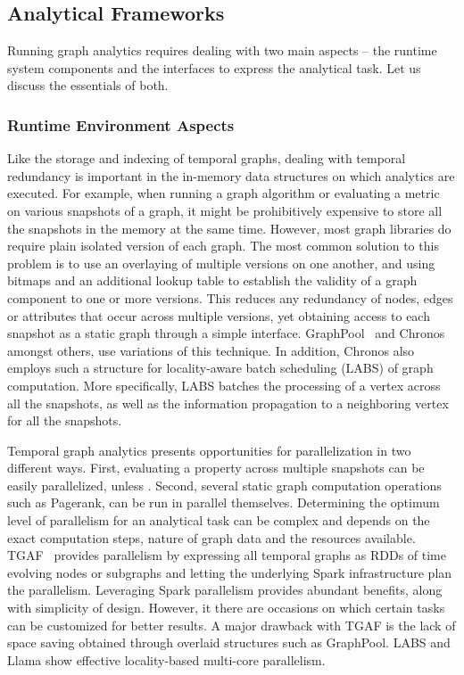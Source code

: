 \documentclass[graybox, natbib, nosecnum, twocolumn]{svmult}
\begin{document}
\subsection{Analytical Frameworks}

Running graph analytics requires dealing with two main aspects -- the runtime system components and the interfaces to express the analytical task. Let us discuss the essentials of both.

\subsubsection{Runtime Environment Aspects}

 Like the storage and indexing of temporal graphs, dealing with temporal redundancy is important in the in-memory data structures on which analytics are executed. For example, when running a graph algorithm or evaluating a metric on various snapshots of a graph, it might be prohibitively expensive to store all the snapshots in the memory at the same time. However, most graph libraries do require plain isolated version of each graph. The most common solution to this problem is to use an overlaying of multiple versions on one another, and using bitmaps and an additional lookup table to establish the validity of a graph component to one or more versions. This reduces any redundancy of nodes, edges or attributes that occur across multiple versions, yet obtaining access to each snapshot as a static graph through a simple interface. GraphPool~\citep{khurana2013efficient} and Chronos~\citep{han2014chronos} amongst others, use variations of this technique. In addition, Chronos also employs such a structure for locality-aware batch scheduling (LABS) of graph computation. More specifically, LABS batches the processing of a vertex across all the snapshots, as well as the information propagation to a neighboring vertex for all the snapshots.

\vspace{2mm}

 Temporal graph analytics presents opportunities for parallelization in two different ways. First, evaluating a property across multiple snapshots can be easily parallelized, unless . Second, several static graph computation operations such as Pagerank, can be run in parallel themselves. Determining the optimum level of parallelism for an analytical task can be complex and depends on the exact computation steps, nature of graph data and the resources available. TGAF~\citep{khurana2016storing} provides parallelism by expressing all temporal graphs as RDDs of time evolving nodes or subgraphs and letting the underlying Spark infrastructure plan the parallelism. Leveraging Spark parallelism provides abundant benefits, along with simplicity of design. However, it there are occasions on which certain tasks can be customized for better results. A major drawback with TGAF is the lack of space saving obtained through overlaid structures such as GraphPool. LABS and Llama show effective locality-based multi-core parallelism.%
\end{document}
